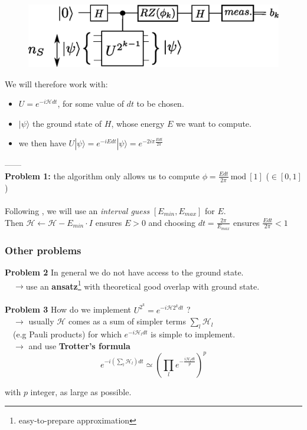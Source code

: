 \documentclass{beamer}
\begin{document}
\begin{frame}

\begin{center}
\begin{figure}
\includegraphics[width=.6\textwidth]{iterative_pea.eps}
\end{figure}
\end{center}

We will therefore work with:
\begin{itemize} 
\item $U=e^{-i\mathcal{H}dt}$, for some value of $dt$ to be chosen.
\item $|\psi\rangle$ the ground state of $H$, whose energy $E$ we want to compute.
\item we then have $U|\psi\rangle = e^{-iEdt}|\psi\rangle= e^{-2i\pi\frac{Edt}{2\pi}}$
\end{itemize}
------\\
\textbf{Problem 1:} the algorithm only allows us to compute $\phi=\frac{Edt}{2\pi}\: \text{mod}\: \left[1\right]$ ($\in \left[0,1\right]$)\\~\\
Following \textcolor{blue}{\cite{whitfield2011simulation}}, we will use an \emph{interval guess} $\left[E_{min},E_{max}\right]$ 
for $E$.\\
Then $\mathcal{H}\leftarrow \mathcal{H}-E_{min}\cdot I$ ensures $E>0$ and choosing $dt=\frac{2\pi}{E_{max}}$ ensures $\frac{Edt}{2\pi}<1$ 

\end{frame}

\begin{frame}
\frametitle{Other problems}
\textbf{Problem 2} In general we do not have access to the ground state.\\$\quad\rightarrow$use an \textbf{ansatz}\footnote{easy-to-prepare approximation} 
with theoretical good overlap with ground state.\\~\\

\textbf{Problem 3} How do we implement $U^{2^{k}} = e^{-i\mathcal{H}2^{k}dt}$ ?\\
$\quad\rightarrow$ usually $\mathcal{H}$ comes as a sum of simpler terms $\sum_{l} \mathcal{H}_{l}$\\
$\quad$(e.g Pauli products) for which $e^{-i\mathcal{H}_{l}dt}$ is simple to implement.\\
$\quad\rightarrow$ and use \textbf{Trotter's formula} \textcolor{blue}{\cite{whitfield2011simulation}} 
$$ e^{-i\left(\sum_{l}\mathcal{H}_{l}\right)dt} \simeq \left(\prod_{l} e^{-\frac{i\mathcal{H}_{l}dt}{p} }\right)^{p} $$ 

with $p$ integer, as large as possible.

\end{frame}
\end{document}
